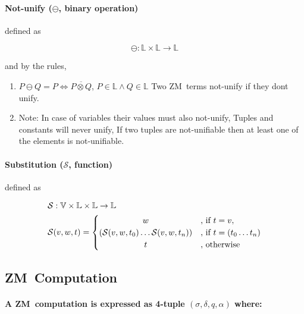 \documentclass[11pt,a4paper]{report}
\newcommand{\zm}{ZM}
\newcommand{\unify}{\otimes}
\newcommand{\notUnify}{\ominus}
\begin{document}
\paragraph{Not-unify ($\notUnify$, binary operation)} defined as

\[
    \notUnify: \mathbb{L} \times \mathbb{L} \rightarrow \mathbb{L}
\]

and by the rules,

\begin{enumerate}
    \item $P \notUnify Q = P \iff \overline{P \unify Q}$, $P \in \mathbb{L} \wedge Q \in \mathbb{L}$
    \subitem Two \zm\ terms not-unify if they dont unify.
\item Note:
    \subitem In case of variables their values must also not-unify,
    \subitem Tuples and constants will never unify,
    \subitem If two tuples are not-unifiable then at least one of the elements is not-unifiable.
\end{enumerate}



\paragraph{Substitution ($\mathcal{S}$, function)} defined as

\begin{align}
    \mathcal{S}&: \mathbb{V} \times \mathbb{L} \times \mathbb{L} \rightarrow \mathbb{L}\\
    \mathcal{S}&(v, w, t) = 
    \begin{cases}
        \hfill w \hfill &\text{, if } t = v,\\
        \hfill (\mathcal{S}(v, w, t_{0}) \ldots \mathcal{S}(v, w, t_{n})) \hfill & \text{, if } t = (t_{0} \ldots t_{n})\\
        \hfill t \hfill & \text{, otherwise}
    \end{cases}
\end{align}



\subsection{\zm\ Computation}
\paragraph{A \zm\ computation is expressed as 4-tuple $(\sigma, \delta, q, \alpha)$ where:}
\end{document}
